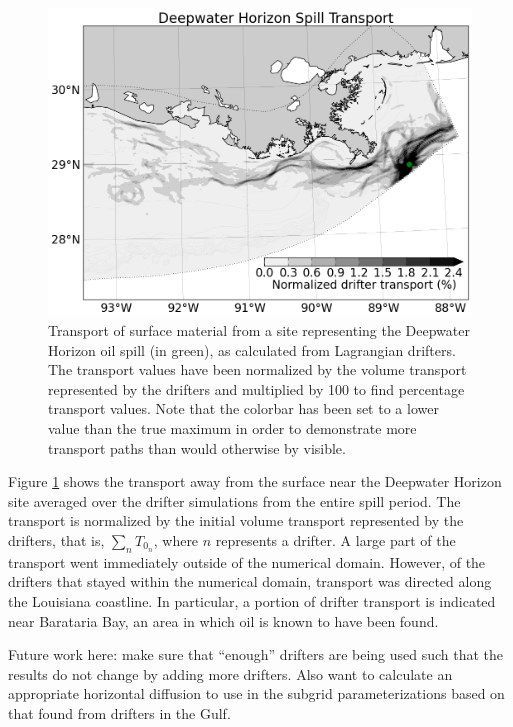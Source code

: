 \documentclass[11pt]{article}
\begin{document}
\begin{figure}
    \centering
    \includegraphics[width=\textwidth]{figures/dwh_stream_f/transport}
    \caption{Transport of surface material from a site representing the Deepwater Horizon oil spill (in green), as calculated from Lagrangian drifters. The transport values have been normalized by the volume transport represented by the drifters and multiplied by 100 to find percentage transport values. Note that the colorbar has been set to a lower value than the true maximum in order to demonstrate more transport paths than would otherwise by visible.}
    \label{fig:dwh_transport}
\end{figure}

Figure \ref{fig:dwh_transport} shows the transport away from the surface near the Deepwater Horizon site averaged over the drifter simulations from the entire spill period. The transport is normalized by the initial volume transport represented by the drifters, that is, $\sum_n T_{0_n}$, where $n$ represents a drifter. A large part of the transport went immediately outside of the numerical domain. However, of the drifters that stayed within the numerical domain, transport was directed along the Louisiana coastline. In particular, a portion of drifter transport is indicated near Barataria Bay, an area in which oil is known to have been found.
 
Future work here: make sure that ``enough'' drifters are being used such that the results do not change by adding more drifters. Also want to calculate an appropriate horizontal diffusion to use in the subgrid parameterizations based on that found from drifters in the Gulf.
\end{document}
